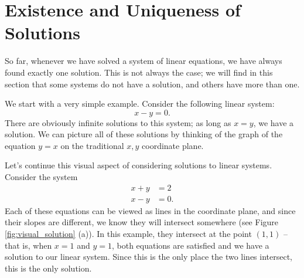 \section{Existence and Uniqueness of Solutions}\label{sec:existence}


So far, whenever we have solved a system of linear equations, we have always found exactly one solution. This is not always the case; we will find in this section that some systems do not have a solution, and others have more than one. 


We start with a very simple example. Consider the following linear system: 
\[
x-y=0.
\]
There are obviously infinite solutions to this system; as long as $x=y$, we have a solution. We can picture all of these solutions by thinking of the graph of the equation $y=x$ on the traditional $x,y$ coordinate plane.

Let's continue this visual aspect of considering solutions to linear systems. Consider the system 
\begin{align*}
 x+y&=2\\ 
 x-y&=0. 
\end{align*} 
Each of these equations can be viewed as lines in the coordinate plane, and since their slopes are different, we know they will intersect somewhere (see Figure \ref{fig:visual_solution} (a)). In this example, they intersect at the point $(1,1)$ -- that is, when $x=1$ and $y=1$, both equations are satisfied and we have a solution to our linear system. Since this is the only place the two lines intersect, this is the only solution. 

